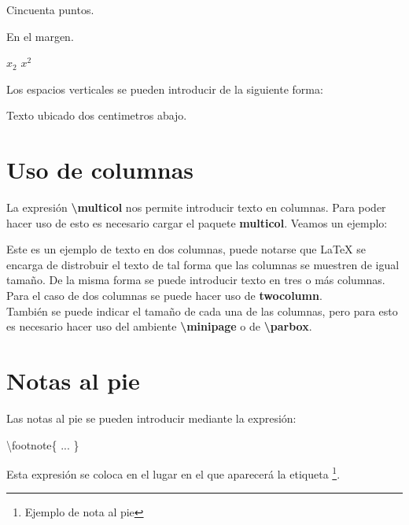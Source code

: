 \documentclass[letterpaper,12pt]{article}
\begin{document}
\hspace{50pt}Cincuenta puntos.

\hspace{-3cm}En el margen.

$x_{2}$ \hspace{4cm} $x^{2}$

Los espacios verticales se pueden introducir de la siguiente forma:

\vspace{2cm}Texto ubicado dos centimetros abajo.



\section{Uso de columnas}

La expresión \textbf{\textbackslash multicol} nos permite introducir texto en columnas. Para poder hacer uso de esto es necesario cargar el paquete \textbf{multicol}. Veamos un ejemplo:

\begin{multicols}{2}
Este es  un ejemplo de texto en dos columnas, puede notarse que \LaTeX{} se encarga de distrobuir el texto de tal forma que las columnas se muestren de igual tamaño. De la misma forma se puede introducir texto en tres o más columnas.\\
Para el caso de dos columnas se puede hacer uso de \textbf{twocolumn}.\\
También se puede indicar el tamaño de cada una de las columnas, pero para esto es necesario hacer uso del ambiente \textbf{\textbackslash minipage} 
o de \textbf{\textbackslash parbox}.
\end{multicols}

\pagebreak

\section{Notas al pie}

Las notas al pie se pueden introducir mediante la expresión:
\begin{center}
\textbackslash footnote\{ ... \}
\end{center}
Esta expresión se coloca en el lugar en el que aparecerá la etiqueta \footnote{Ejemplo de nota al pie}.
\end{document}
